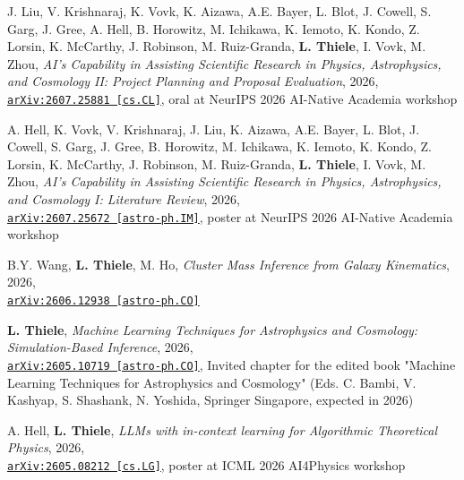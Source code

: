 \begin{minipage}{\textwidth}
J. Liu, V. Krishnaraj, K. Vovk, K. Aizawa, A.E. Bayer, L. Blot, J. Cowell, S. Garg, J. Gree, A. Hell, B. Horowitz, M. Ichikawa, K. Iemoto, K. Kondo, Z. Lorsin, K. McCarthy, J. Robinson, M. Ruiz-Granda, {\bf L. Thiele}, I. Vovk, M. Zhou,
\emph{AI's Capability in Assisting Scientific Research in Physics, Astrophysics, and Cosmology II: Project Planning and Proposal Evaluation}, 2026,\\
\href{https://arxiv.org/abs/2607.25881}{\mbox{\texttt{arXiv:2607.25881 [cs.CL]}}},
oral at NeurIPS 2026 AI-Native Academia workshop
\end{minipage}

\begin{minipage}{\textwidth}
A. Hell, K. Vovk, V. Krishnaraj, J. Liu, K. Aizawa, A.E. Bayer, L. Blot, J. Cowell, S. Garg, J. Gree, B. Horowitz, M. Ichikawa, K. Iemoto, K. Kondo, Z. Lorsin, K. McCarthy, J. Robinson, M. Ruiz-Granda, {\bf L. Thiele}, I. Vovk, M. Zhou,
\emph{AI's Capability in Assisting Scientific Research in Physics, Astrophysics, and Cosmology I: Literature Review}, 2026,\\
\href{https://arxiv.org/abs/2607.25672}{\mbox{\texttt{arXiv:2607.25672 [astro-ph.IM]}}},
poster at NeurIPS 2026 AI-Native Academia workshop
\end{minipage}

\begin{minipage}{\textwidth}
B.Y. Wang, {\bf L. Thiele}, M. Ho,
\emph{Cluster Mass Inference from Galaxy Kinematics}, 2026,\\
\href{https://arxiv.org/abs/2606.12938}{\mbox{\texttt{arXiv:2606.12938 [astro-ph.CO]}}}
\end{minipage}

\begin{minipage}{\textwidth}
{\bf L. Thiele},
\emph{Machine Learning Techniques for Astrophysics and Cosmology: Simulation-Based Inference}, 2026,\\
\href{https://arxiv.org/abs/2605.10719}{\mbox{\texttt{arXiv:2605.10719 [astro-ph.CO]}}},
Invited chapter for the edited book "Machine Learning Techniques for Astrophysics and Cosmology" (Eds. C. Bambi, V. Kashyap, S. Shashank, N. Yoshida, Springer Singapore, expected in 2026)
\end{minipage}

\begin{minipage}{\textwidth}
A. Hell, {\bf L. Thiele},
\emph{LLMs with in-context learning for Algorithmic Theoretical Physics}, 2026,\\
\href{https://arxiv.org/abs/2605.08212}{\mbox{\texttt{arXiv:2605.08212 [cs.LG]}}}, poster at ICML 2026 AI4Physics workshop
\end{minipage}

